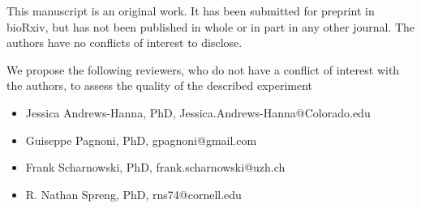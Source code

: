 \documentclass{article}
\begin{document}
This manuscript is an original work. It has been submitted for preprint in bioRxiv, but has not been published in whole or in part in any other journal. The authors have no conflicts of interest to disclose. 

We propose the following reviewers, who do not have a conflict of interest with the authors, to assess the quality of the described experiment

\begin{itemize}
\item Jessica Andrews-Hanna, PhD, Jessica.Andrews-Hanna@Colorado.edu
\item Guiseppe Pagnoni, PhD, gpagnoni@gmail.com
\item Frank Scharnowski, PhD, frank.scharnowski@uzh.ch
\item R. Nathan Spreng, PhD, rns74@cornell.edu
\end{itemize}
\end{document}
